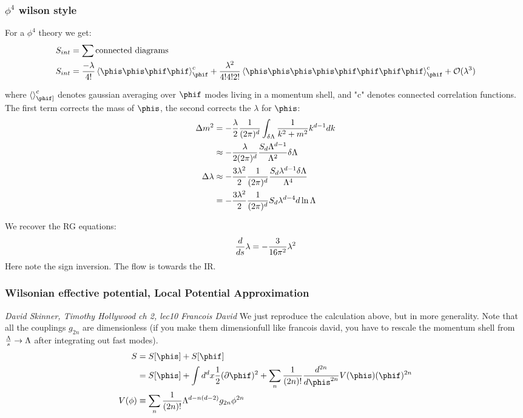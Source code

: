 \documentclass[11pt]{scrartcl}
\begin{document}
\subsubsection{$\phi^4$ wilson style}
For a $\phi^4$ theory we get:
\begin{align}
	S_{int} &= \sum \text{connected diagrams} \\
	S_{int} &= {-\lambda \over 4!} \braket{\phis \phis \phif \phif}_{\phif}^c + {\lambda^2 \over 4! 4! 2!} \braket{\phis \phis \phis \phis \phif \phif \phif \phif}_{\phif}^c + \mathcal{O} (\lambda^3)
	\end{align}

where $ \braket{}_{\phif]}^c$ denotes gaussian averaging over $\phif$ modes living in a momentum shell, and "c" denotes connected correlation functions.
The first term corrects the mass of $\phis$, the second corrects the $\lambda$ for $\phis$:
\begin{align}
	\Delta m^2 &= -{\lambda \over 2} {1 \over (2 \pi)^d} \int_{\delta \Lambda} {1 \over k^2 + m^2} k^{d-1} dk \\
	&\approx -{\lambda \over 2 (2 \pi)^d} {S_{d} \Lambda^{d-1} \over \Lambda^2} \delta \Lambda \\
	\Delta \lambda &\approx -{3 \lambda^2 \over 2} {1 \over (2 \pi)^d} {S_d \lambda^{d-1} \delta \Lambda \over \Lambda^4} \\
	&=  -{3 \lambda^2 \over 2} {1 \over (2 \pi)^d} S_d \lambda^{d-4} d \ln \Lambda \\
	\end{align}

We recover the RG equations:
\begin{align}
	{d \over d s} \lambda = - {3 \over 16 \pi^2} \lambda^2
\end{align}
Here note the sign inversion.  The flow is towards the IR.

\subsubsection{Wilsonian effective potential, Local Potential Approximation}
\emph{David Skinner, Timothy Hollywood ch 2, lec10 Francois David }
We just reproduce the calculation above, but in more generality.  Note that all the couplings $g_{2n}$ are dimensionless (if you make them dimensionfull like francois david, you have to rescale the momentum shell from ${\Lambda \over s} \rightarrow \Lambda$ after integrating out fast modes).  
\begin{align}
	S &= S[\phis] + S[\phif] \\
	 & = S[ {\phis} ] + \int d^d x \frac12 ( \partial \phif )^2 + \sum_{n} {1 \over (2n)!} {d^{2n} \over d {\phis} ^{2n}} V( {\phis} ) ({\phif} )^{2n} \\
	 V(\phi) &\equiv \sum_n {1 \over (2n)!} \Lambda^{d-n(d-2)}g_{2n} \phi^{2n} \\
	\end{align}
\end{document}
